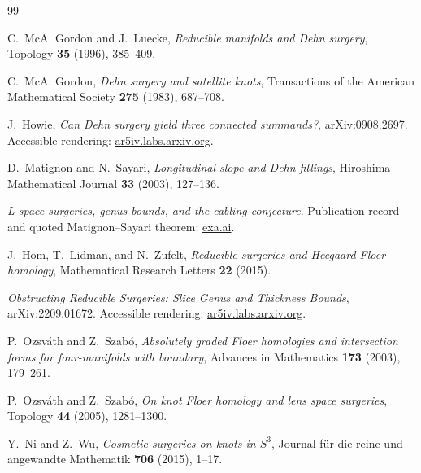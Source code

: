\documentclass[11pt]{article}
\theoremstyle{definition}
\theoremstyle{remark}
\begin{document}
\begin{thebibliography}{99}

C.~McA. Gordon and J.~Luecke,
\emph{Reducible manifolds and Dehn surgery},
Topology \textbf{35} (1996), 385--409.

C.~McA. Gordon,
\emph{Dehn surgery and satellite knots},
Transactions of the American Mathematical Society \textbf{275} (1983),
687--708.

J.~Howie,
\emph{Can Dehn surgery yield three connected summands?},
arXiv:0908.2697.  Accessible rendering:
\href{https://ar5iv.labs.arxiv.org/html/0908.2697}{ar5iv.labs.arxiv.org}.

D.~Matignon and N.~Sayari,
\emph{Longitudinal slope and Dehn fillings},
Hiroshima Mathematical Journal \textbf{33} (2003), 127--136.

\emph{L-space surgeries, genus bounds, and the cabling conjecture}.
Publication record and quoted Matignon--Sayari theorem:
\href{https://exa.ai/library/publication/zl1m8jt741b}{exa.ai}.

J.~Hom, T.~Lidman, and N.~Zufelt,
\emph{Reducible surgeries and Heegaard Floer homology},
Mathematical Research Letters \textbf{22} (2015).

\emph{Obstructing Reducible Surgeries: Slice Genus and Thickness Bounds},
arXiv:2209.01672.  Accessible rendering:
\href{https://ar5iv.labs.arxiv.org/html/2209.01672}{ar5iv.labs.arxiv.org}.

P.~Ozsv\'ath and Z.~Szab\'o,
\emph{Absolutely graded Floer homologies and intersection forms for
four-manifolds with boundary},
Advances in Mathematics \textbf{173} (2003), 179--261.

P.~Ozsv\'ath and Z.~Szab\'o,
\emph{On knot Floer homology and lens space surgeries},
Topology \textbf{44} (2005), 1281--1300.

Y.~Ni and Z.~Wu,
\emph{Cosmetic surgeries on knots in $S^3$},
Journal f\"ur die reine und angewandte Mathematik \textbf{706} (2015),
1--17.

\end{thebibliography}
\end{document}
